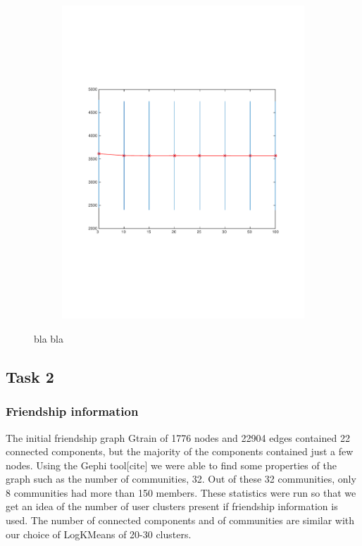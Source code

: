 \begin{figure}[h]
\begin{subfigure}[b]{0.45\textwidth}
    \includegraphics[width=\textwidth]{figures/kmeans_test.pdf}
    \caption{}
  \end{subfigure}
  \caption{bla bla}
  \label{fig:kmeans_final}
\end{figure}



\subsection{Task 2}
\subsubsection{Friendship information}
The initial friendship graph Gtrain of 1776 nodes and 22904 edges contained 22 connected components, but the majority of the components contained just a few nodes.
Using the Gephi tool[cite] we were able to find some properties of the graph such as the number of communities, 32.  Out of these 32 communities, only 8 communities had more than 150 members.
These statistics were run so that we get an idea of the number of user clusters present if friendship information is used. The number of connected components and of communities are similar with our choice of LogKMeans of 20-30 clusters.

